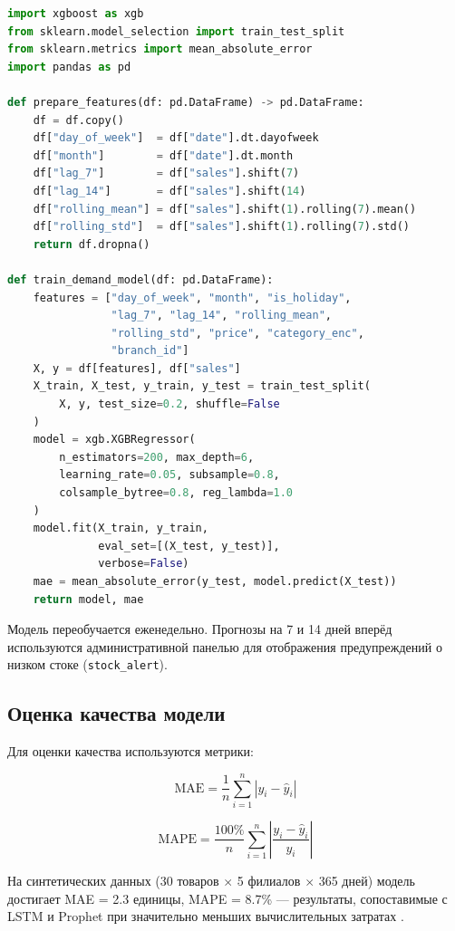 \documentclass[14pt,a4paper]{extreport}
\begin{document}
\begin{lstlisting}[language=Python, caption={Прогнозирование спроса через XGBoost}]
import xgboost as xgb
from sklearn.model_selection import train_test_split
from sklearn.metrics import mean_absolute_error
import pandas as pd

def prepare_features(df: pd.DataFrame) -> pd.DataFrame:
    df = df.copy()
    df["day_of_week"]  = df["date"].dt.dayofweek
    df["month"]        = df["date"].dt.month
    df["lag_7"]        = df["sales"].shift(7)
    df["lag_14"]       = df["sales"].shift(14)
    df["rolling_mean"] = df["sales"].shift(1).rolling(7).mean()
    df["rolling_std"]  = df["sales"].shift(1).rolling(7).std()
    return df.dropna()

def train_demand_model(df: pd.DataFrame):
    features = ["day_of_week", "month", "is_holiday",
                "lag_7", "lag_14", "rolling_mean",
                "rolling_std", "price", "category_enc",
                "branch_id"]
    X, y = df[features], df["sales"]
    X_train, X_test, y_train, y_test = train_test_split(
        X, y, test_size=0.2, shuffle=False
    )
    model = xgb.XGBRegressor(
        n_estimators=200, max_depth=6,
        learning_rate=0.05, subsample=0.8,
        colsample_bytree=0.8, reg_lambda=1.0
    )
    model.fit(X_train, y_train,
              eval_set=[(X_test, y_test)],
              verbose=False)
    mae = mean_absolute_error(y_test, model.predict(X_test))
    return model, mae
\end{lstlisting}

Модель переобучается еженедельно. Прогнозы на 7 и 14 дней вперёд используются административной панелью для отображения предупреждений о низком стоке (\texttt{stock\_alert}).

\subsection{Оценка качества модели}

Для оценки качества используются метрики:

\begin{equation}
  \text{MAE} = \frac{1}{n}\sum_{i=1}^{n}|y_i - \hat{y}_i|
\end{equation}

\begin{equation}
  \text{MAPE} = \frac{100\%}{n}\sum_{i=1}^{n}\left|\frac{y_i - \hat{y}_i}{y_i}\right|
\end{equation}

На синтетических данных (30 товаров $\times$ 5 филиалов $\times$ 365 дней) модель достигает MAE = 2.3 единицы, MAPE = 8.7\% — результаты, сопоставимые с LSTM и Prophet при значительно меньших вычислительных затратах \cite{makridakis2020}.
\end{document}
